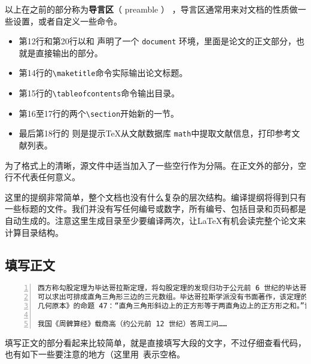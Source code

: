 以上在\verb||之前的部分称为\textbf{导言区}（ preamble ） ，导言区通常用来对文档的性质做一些设置，或者自定义一些命令。

\begin{itemize}
    \item 第12行和第20行以\verb||和\verb|| 声明了一个 \verb|document| 环境，里面是论文的正文部分，也就是直接输出的部分。
    \item 第14行的\verb|\maketitle|命令实际输出论文标题。
    \item 第15行的\verb|\tableofcontents|命令输出目录。
    \item 第16至17行的两个\verb|\section|开始新的一节。
    \item 最后第18行的\verb|| 则是提示\TeX 从文献数据库 \verb|math|中提取文献信息，打印参考文献列表。
\end{itemize}

为了格式上的清晰，源文件中适当加入了一些空行作为分隔。在正文外的部分，空行不代表任何意义。

这里的提纲非常简单，整个文档也没有什么复杂的层次结构。编译提纲将得到只有一些标题的文件。我们并没有写任何编号或数字，所有编号、包括目录和页码都是自动生成的。注意这里生成目录至少要编译两次，让\LaTeX 有机会读完整个论文来计算目录结构。

\subsection{填写正文}

\begin{lstlisting}[showspaces=true,numbers=left]
西方称勾股定理为毕达哥拉斯定理，将勾股定理的发现归功于公元前 6 世纪的毕达哥拉斯学派。该学派得到了一个法则，
可以求出可排成直角三角形三边的三元数组。毕达哥拉斯学派没有书面著作，该定理的严格表述和证明则见于欧几里得《
几何原本》的命题 47：“直角三角形斜边上的正方形等于两直角边上的正方形之和。”证明是用面积做的。

我国《周髀算经》载商高（约公元前 12 世纪）答周工问……
\end{lstlisting}

填写正文的部分看起来比较简单，就是直接填写大段的文字，不过仔细查看代码，也有如下一些要注意的地方（这里用\lstinline[showspaces=true]{ }表示空格。

